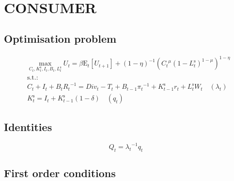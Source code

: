 

\section{CONSUMER}

\subsection{Optimisation problem}

\begin{align}
&\max_{C_{t}, K^{\mathrm{s}}_{t}, I_{t}, B_{t}, L^{\mathrm{s}}_{t}
} U_{t} = {\beta} {\mathrm{E}_{t}\left[U_{t+1}\right]} + \left(1 - \eta\right)^{-1} {\left({{C_{t}}^{\mu}} {\left(1 - L^{\mathrm{s}}_{t}\right)^{1 - \mu}}\right)^{1 - \eta}}\\
&\mathrm{s.t.:}\nonumber\\
& C_{t} + I_{t} + {B_{t}} {R_{t}}^{-1} = {D\!i\!v}_{t} - T_{t} + {B_{t-1}} {\pi_{t}}^{-1} + {K^{\mathrm{s}}_{t-1}} {r_{t}} + {L^{\mathrm{s}}_{t}} {W_{t}} \quad \left(\lambda_{t}\right)\\
& K^{\mathrm{s}}_{t} = I_{t} + {K^{\mathrm{s}}_{t-1}} \left(1 - \delta\right) \quad \left(q_{t}\right)
\end{align}


\subsection{Identities}

\begin{equation}
Q_{t} = {\lambda_{t}}^{-1} {q_{t}}
\end{equation}


\subsection{First order conditions}

